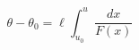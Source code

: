 \begin{equation}
\theta - \theta_0 = \ell \int_{u_{0}}^u  \frac{dx}{F(x)}
\label{quadrature}
\end{equation}

